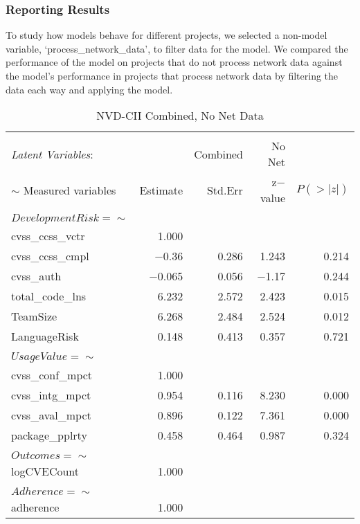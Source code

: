 \subsubsection{Reporting Results}
To study how models behave for different projects, we selected a non-model variable, `process\_network\_data', to filter data for the model. We compared the performance of the model on projects that do not process network data against the model's performance in projects that process network data by filtering the data each way and applying the model.

\begin{table}
	\begin{center}	
		\caption{NVD-CII Combined, No Net Data}
		\label{tab:results_combined1}
		\begin{tabular}{l|rrrr}
			\\[-1.8ex]\hline 
			\hline \\[-1.8ex] 
			\textit{Latent Variables}: &  & Combined & No Net & \\  
			$\sim$ Measured variables& Estimate & Std.Err & z$-$value & $P(>|z|)$ \\
			\hline \\[-1.8ex]
			$DevelopmentRisk =\sim$  & & & & \\                                   
			cvss\_ccss\_vctr   & 1.000 & &  & \\                             
			cvss\_ccss\_cmpl &  $-$0.36 &   0.286 & 1.243 &   0.214\\
			cvss\_auth     &   $-$0.065  &  0.056  & $-$1.17   & 0.244\\
			total\_code\_lns  &  6.232 &   2.572 &   2.423 &   0.015\\
			TeamSize        &  6.268   & 2.484   & 2.524   & 0.012\\
			LanguageRisk    &  0.148  &  0.413   & 0.357   & 0.721\\ 
			& & & & \\  
			$UsageValue =\sim$     & & & & \\                                    		
		    cvss\_conf\_mpct  &  1.000  &	&	&                  \\
		    cvss\_intg\_mpct  &  0.954  &  0.116 &   8.230  &  0.000\\
		    cvss\_aval\_mpct  &  0.896 &   0.122 &   7.361 &   0.000\\
		    package\_pplrty  &  0.458 &   0.464  &  0.987 &   0.324\\	
			& & & & \\  
			$Outcomes =\sim$    & & & & \\                                     
			logCVECount     &  1.000  & & & \\                          
			& & & & \\  
			$Adherence =\sim$   & & & & \\                                      
			adherence    &     1.000        & & & \\    
			

\end{tabular}
\end{center}
\end{table}
